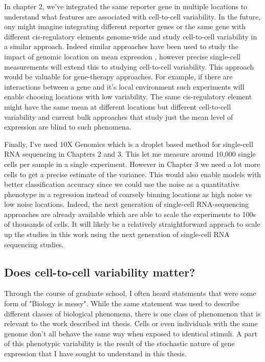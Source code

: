 In chapter 2, we've integrated the same reporter gene in multiple locations to understand what features are associated with cell-to-cell variability. In the future, ony might imagine integrating different reporter genes or the same gene with different cis-regulatory elements genome-wide and study cell-to-cell variability in a similar approach. Indeed similar approaches have been used to study the impact of genomic location on mean expression \cite{hong2022gr}, however precise single-cell measurements will extend this to studying cell-to-cell variability. This approach would be valuable for gene-therapy approaches. For example, if there are interactions between a gene and it's local environment such experiments will enable choosing locations with low variability. The same cis-regulatory element might have the same mean at different locations but different cell-to-cell variability and current bulk approaches that study just the mean level of expression are blind to such phenomena.

Finally, I've used 10X Genomics which is a droplet based method for single-cell RNA sequencing in Chapters 2 and 3. This let me measure around 10,000 single cells per sample in a single experiment. However in Chapter 3 we need a lot more cells to get a precise estimate of the variance. This would also enable models with better classification accuracy since we could use the noise as a quantitative phenotype in a regression instead of coarsely binning locations as high noise vs low noise locations. Indeed, the next generation of single-cell RNA-sequencing approaches are already available \cite{caoj_shendurej:ComprehensiveSinglecell2017} which are able to scale the experiments to 100s of thousands of cells. It will likely be a relatively straightforward apprach to scale up the studies in this work using the next generation of single-cell RNA sequencing studies. 

\subsection{Does cell-to-cell variability matter?}

Through the course of graduate school, I often heard statements that were some form of "Biology is messy". While the same statement was used to describe different classes of biological phenomena, there is one class of phenomenon that is relevant to the work described int thesis. Cells or even individuals with the same genome don't all behave the same way when exposed to identical stimuli. A part of this phenotypic variability is the result of the stochastic nature of gene expression that I have sought to understand in this thesis.

